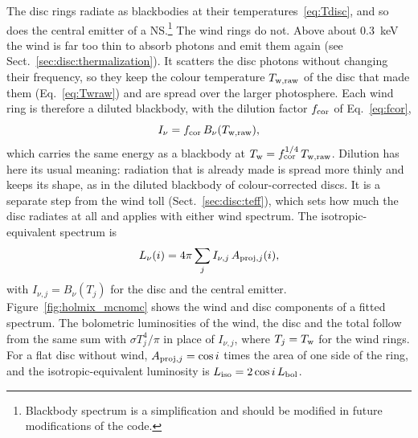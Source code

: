 The disc rings radiate as blackbodies at their temperatures~\eqref{eq:Tdisc}, and so does the central emitter of a NS.\footnote{Blackbody spectrum  is a simplification and should be modified in future modifications of the code.}
The wind rings do not.
Above about 0.3~keV the wind is far too thin to absorb photons and emit them again (see Sect.~\ref{sec:disc:thermalization}).
It scatters the disc photons without changing their frequency, so they keep the colour temperature $T_{\rm w,raw}$ of the disc that made them (Eq.~\ref{eq:Twraw}) and are spread over the larger photosphere.
Each wind ring is therefore a diluted blackbody, with the dilution factor $f_{\rm cor}$ of Eq.~\eqref{eq:fcor},
\begin{equation}
I_\nu = f_{\rm cor}\,B_\nu(T_{\rm w,raw}) ,
\label{eq:Inu_wind}
\end{equation}
which carries the same energy as a blackbody at $T_{\rm w} = f_{\rm cor}^{1/4}\,T_{\rm w,raw}$.
Dilution has here its usual meaning: radiation that is already made is spread more thinly and keeps its shape, as in the diluted blackbody of colour-corrected discs.
It is a separate step from the wind toll (Sect.~\ref{sec:disc:teff}), which sets how much the disc radiates at all and applies with either wind spectrum.
The isotropic-equivalent spectrum is
\begin{equation}
L_\nu(i) = 4\pi\sum_j I_{\nu,j}\,A_{{\rm proj},j}(i) ,
\label{eq:Lnu}
\end{equation}
with $I_{\nu,j} = B_\nu(T_j)$ for the disc and the central emitter.
Figure~\ref{fig:holmix_mcnomc} shows the wind and disc components of a fitted spectrum.
The bolometric luminosities of the wind, the disc and the total follow from the same sum with $\sigma T_j^4/\pi$ in place of $I_{\nu,j}$, where $T_j = T_{\rm w}$ for the wind rings.
For a flat disc without wind, $A_{{\rm proj},j} = \cos i$ times the area of one side of the ring, and the isotropic-equivalent luminosity is $L_{\rm iso} = 2\cos i\,L_{\rm bol}$.

